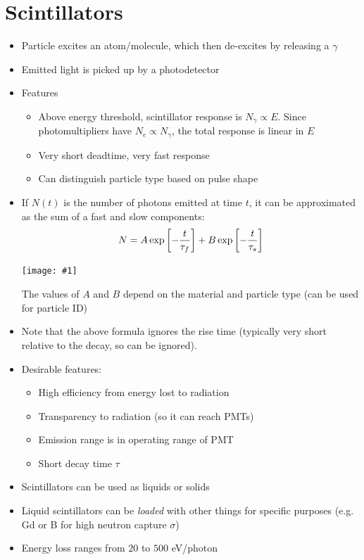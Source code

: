 \documentclass[11pt]{article}
\newcommand{\embedimgw}[2]{\begin{center}\texttt{[image: \#1]}\end{center}}
\begin{document}
\section{Scintillators}
\begin{itemize}
  \item Particle excites an atom/molecule, which then de-excites by releasing a $\gamma$
  \item Emitted light is picked up by a photodetector
  \item Features
  \begin{itemize}
    \item Above energy threshold, scintillator response is $N_\gamma \propto E$. Since photomultipliers have $N_e\propto N_\gamma$, the total response is linear in $E$
    \item Very short deadtime, very fast response
    \item Can distinguish particle type based on pulse shape
  \end{itemize}
  \item If $N(t)$ is the number of photons emitted at time $t$, it can be approximated as the sum of a fast and slow components:
  \begin{equation}
    N = A\exp \left[-\frac{t}{\tau_f}\right] + B\exp \left[-\frac{t}{\tau_{s\vphantom{f}}}\right]
  \end{equation}
  \embedimgw{figs/scint_response.png}{.8}
  The values of $A$ and $B$ depend on the material and particle type (can be used for particle ID)
  \item Note that the above formula ignores the rise time (typically very short relative to the decay, so can be ignored).
  \item Desirable features:
  \begin{itemize}
    \item High efficiency from energy lost to radiation
    \item Transparency to radiation (so it can reach PMTs)
    \item Emission range is in operating range of PMT
    \item Short decay time $\tau$
  \end{itemize}
  \item Scintillators can be used as liquids or solids
  \item Liquid scintillators can be \emph{loaded} with other things for specific purposes (e.g. Gd or B for high neutron capture $\sigma$)
  \item Energy loss ranges from $20$ to $500$ eV/photon
\end{itemize}
\end{document}
